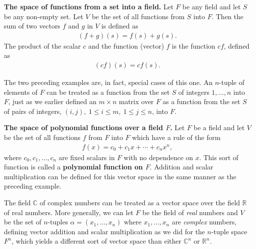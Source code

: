 \documentclass[12pt]{article}
\begin{document}
\begin{exm}
  \textbf{The space of functions from a set into a field.} Let
  $F$ be any field and let $S$ be any non-empty set. Let $V$ be
  the set of all functions from $S$ into $F$. Then the sum of two
  vectors $f$ and $g$ in $V$ is defined as
  \begin{align*}
    (f + g)(s) = f(s) + g(s).
  \end{align*}
  The product of the scalar $c$ and the function (vector) $f$ is
  the function $cf$, defined as
  \begin{align*}
    (cf)(s) = cf(s).
  \end{align*}
\end{exm}

\begin{comm}
  The two preceding examples are, in fact, special cases of this
  one. An $n$-tuple of elements of $F$ can be treated as a
  function from the set $S$ of integers $1,\ldots,n$ into $F$,
  just as we earlier defined an $m \times n$ matrix over $F$ as a
  function from the set $S$ of pairs of integers, $(i,j),\ 1 \leq
  i \leq m,\ 1 \leq j \leq n$, into $F$.
\end{comm}

\begin{exm}
  \textbf{The space of polynomial functions over a field $F$.}
  Let $F$ be a field and let $V$ be the set of all functions $f$
  from $F$ into $F$ which have a rule of the form
  \begin{align*}
    f(x) = c_0 + c_1x + \cdots + c_nx^n,
  \end{align*}
  where $c_0,c_1,\ldots,c_n$ are fixed scalars in $F$ with no
  dependence on $x$. This sort of function is called a
  \textbf{polynomial function on $F$}. Addition and scalar
  multiplication can be defined for this vector space in the same
  manner as the preceding example.
\end{exm}

\begin{exm}
  The field $\mathbb{C}$ of complex numbers can be treated as a
  vector space over the field $\mathbb{R}$ of real numbers. More
  generally, we can let $F$ be the field of \textit{real} numbers
  and $V$ be the set of $n$-tuples $\alpha = (x_1,\ldots,x_n)$
  where $x_1,\ldots,x_n$ are \textit{complex} numbers, defining
  vector addition and scalar multiplication as we did for the
  $n$-tuple space $F^n$, which yields a different sort of vector
  space than either $\mathbb{C}^n$ or $\mathbb{R}^n$.
\end{exm}
\end{document}

